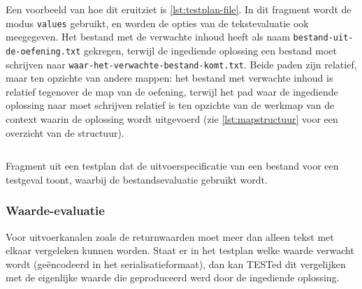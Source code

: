 Een voorbeeld van hoe dit eruitziet is \cref{lst:testplan-file}.
In dit fragment wordt de modus \texttt{values} gebruikt, en worden de opties van de tekstevaluatie ook meegegeven.
Het bestand met de verwachte inhoud heeft als naam \texttt{bestand-uit-de-oefening.txt} gekregen, terwijl de ingediende oplossing een bestand moet schrijven naar \texttt{waar-het-verwachte-bestand-komt.txt}.
Beide paden zijn relatief, maar ten opzichte van andere mappen: het bestand met verwachte inhoud is relatief tegenover de map van de oefening, terwijl het pad waar de ingediende oplossing naar moet schrijven relatief is ten opzichte van de werkmap van de context waarin de oplossing wordt uitgevoerd (zie \cref{lst:mapstructuur} voor een overzicht van de structuur).

\begin{listing}
    \inputminted{json}{code/testplan-file.json}
    \caption{Fragment uit een testplan dat de uitvoerspecificatie van een bestand voor een testgeval toont, waarbij de bestandsevaluatie gebruikt wordt.}
    \label{lst:testplan-file}
\end{listing}

\subsubsection{Waarde-evaluatie}

Voor uitvoerkanalen zoals de returnwaarden moet meer dan alleen tekst met elkaar vergeleken kunnen worden.
Staat er in het testplan welke waarde verwacht wordt (geëncodeerd in het serialisatieformaat), dan kan TESTed dit vergelijken met de eigenlijke waarde die geproduceerd werd door de ingediende oplossing.

